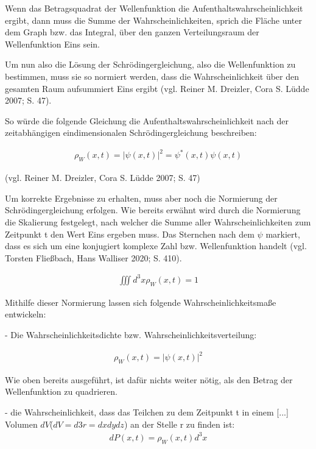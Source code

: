 \documentclass[12pt,oneside, a4paper]{scrbook}
\begin{document}
Wenn das Betragsquadrat der Wellenfunktion die Aufenthaltswahrscheinlichkeit ergibt, dann muss die Summe der Wahrscheinlichkeiten, sprich die Fläche unter dem Graph bzw. das Integral, über den ganzen Verteilungsraum der Wellenfunktion Eins sein.

Um nun also die Lösung der Schrödingergleichung, also die Wellenfunktion zu bestimmen, muss sie so normiert werden, dass die Wahrscheinlichkeit über den gesamten Raum aufsummiert Eins ergibt (vgl. Reiner M. Dreizler, Cora S. Lüdde 2007; S. 47).

So würde die folgende Gleichung die Aufenthaltswahrscheinlichkeit nach der zeitabhängigen eindimensionalen Schrödingergleichung beschreiben:

\begin{align}
  \rho_{W}(x,t) = |\psi(x,t)|^2 = \psi^{*}(x,t)\psi(x,t)
\end{align}
\begin{center} (vgl. Reiner M. Dreizler, Cora S. Lüdde 2007; S. 47) \end{center}

Um korrekte Ergebnisse zu erhalten, muss aber noch die Normierung der Schrödingergleichung erfolgen. Wie bereits erwähnt wird durch die Normierung die Skalierung festgelegt, nach welcher die Summe aller Wahrscheinlichkeiten zum Zeitpunkt t den Wert Eins ergeben muss.
Das Sternchen nach dem $\psi$ markiert, dass es sich um eine konjugiert komplexe Zahl bzw. Wellenfunktion handelt (vgl. Torsten Fließbach, Hans Walliser 2020; S. 410).

\begin{align}
  \iiint d^{3}x \rho_{W} (x, t) = 1
\end{align}

Mithilfe dieser Normierung lassen sich folgende Wahrscheinlichkeitsmaße entwickeln:

- Die Wahrscheinlichkeitsdichte bzw. Wahrscheinlichkeitsverteilung:

\begin{align}
  \rho_{W} (x,t) = |\psi(x,t)|^{2}
\end{align}

Wie oben bereits ausgeführt, ist dafür nichts weiter nötig, als den Betrag der Wellenfunktion zu quadrieren.

- die Wahrscheinlichkeit, dass das Teilchen zu dem Zeitpunkt t in einem [...] Volumen $dV$($dV = d3r = dxdydz$) an der Stelle r zu finden ist:
\begin{align}
  dP(x,t) = \rho_{W} (x,t)d^{3}x
\end{align}
\end{document}

